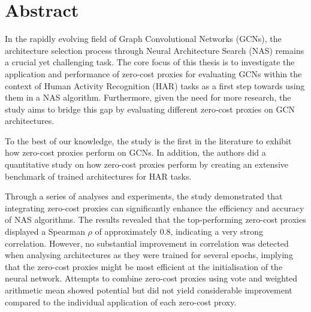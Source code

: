 \chapter*{Abstract}

In the rapidly evolving field of Graph Convolutional Networks (\gls{GCN}s), the architecture selection process through Neural Architecture Search (\gls{NAS}) remains a crucial yet challenging task. The core focus of this thesis is to investigate the application and performance of zero-cost proxies for evaluating \glspl{GCN} within the context of Human Activity Recognition (\gls{HAR}) tasks as a first step towards using them in a \gls{NAS} algorithm. Furthermore, given the need for more research, the study aims to bridge this gap by evaluating different zero-cost proxies on \gls{GCN} architectures. 

To the best of our knowledge, the study is the first in the literature to exhibit how zero-cost proxies perform on \gls{GCN}s. In addition, the authors did a quantitative study on how zero-cost proxies perform by creating an extensive benchmark of trained architectures for \gls{HAR} tasks.

Through a series of analyses and experiments, the study demonstrated that integrating zero-cost proxies can significantly enhance the efficiency and accuracy of \gls{NAS} algorithms. The results revealed that the top-performing zero-cost proxies displayed a Spearman $\rho$ of approximately $0.8$, indicating a very strong correlation. However, no substantial improvement in correlation was detected when analysing architectures as they were trained for several epochs, implying that the zero-cost proxies might be most efficient at the initialisation of the neural network. Attempts to combine zero-cost proxies using vote and weighted arithmetic mean showed potential but did not yield considerable improvement compared to the individual application of each zero-cost proxy. 